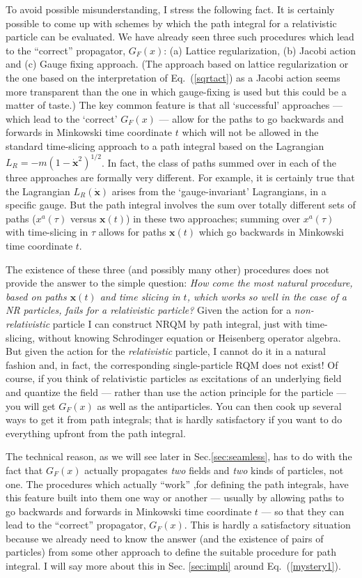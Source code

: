 \documentclass{article}
\def\eq#1{{Eq.~(\ref{#1})}}
\begin{document}
To avoid possible misunderstanding, I stress the following fact. It is certainly possible to come up with schemes by which the path integral for a relativistic particle can be evaluated. We have already seen three such procedures which lead to the ``correct'' propagator, $G_F(x)$: (a) Lattice regularization, (b) Jacobi action and (c) Gauge fixing approach.  
(The approach based on lattice regularization or the one based on the interpretation of \eq{sqrtact} as a Jacobi action seems more transparent than the one in which gauge-fixing is used but this could be a matter of taste.) The key common feature is that all `successful' approaches --- which lead to the `correct' $G_F(x)$ --- allow for the paths to go backwards and forwards in Minkowski time coordinate $t$ which will not be allowed in the standard time-slicing approach to a path integral based on the Lagrangian $L_R=-m(1-\dot{\bm x}^2)^{1/2}$. In fact, the class of paths summed over in each of the three approaches are formally very different. For example, it is certainly true that the Lagrangian $L_R(\dot{\bm x})$ arises from the `gauge-invariant' Lagrangians, in a specific gauge. But the path integral involves the sum over totally different sets of paths ($x^a(\tau)$ versus $\bm x(t)$) in these two approaches; summing over $x^a(\tau)$ with time-slicing in $\tau$ allows for paths  $\bm x(t)$ which go backwards in Minkowski time coordinate $t$.

The existence of these three (and possibly many other) procedures does not provide the answer to the simple question: \textit{How come the most natural procedure, based on paths $\bm x(t)$ and time slicing in $t$, which works so well in the case of a NR particles, fails for a relativistic particle?} 
Given the action for a \textit{non-relativistic} particle I can construct NRQM by path integral, just with time-slicing, without knowing Schrodinger equation or Heisenberg operator algebra. But given the action for the \textit{relativistic} particle, I cannot do it in a natural fashion and, in fact, the corresponding single-particle  RQM does not exist!
Of course, if you think of relativistic particles as excitations of an underlying field and quantize the field --- rather than use the action principle for the particle --- you will get $G_F(x)$ as well as the antiparticles. You can then cook up several ways to get it from path integrals; that is hardly satisfactory if you want to do everything upfront from the path integral.

The technical reason, as we will see later in Sec.\ref{sec:seamless}, has to do with the fact that $G_F(x)$ actually propagates \textit{two} fields and \textit{two} kinds of particles, not one. The procedures which actually ``work'' ,for defining the path integrals, have this feature built into them one way or another --- usually by allowing paths to go backwards and forwards  in Minkowski time coordinate $t$ --- so that they can lead to the ``correct'' propagator, $G_F(x)$. This is hardly a satisfactory situation because we already need to know the answer (and  the existence of pairs of particles) from some other approach to define the suitable procedure for path integral. I will say more about this in Sec. \ref{sec:impli} around \eq{mystery1}.
\end{document}
